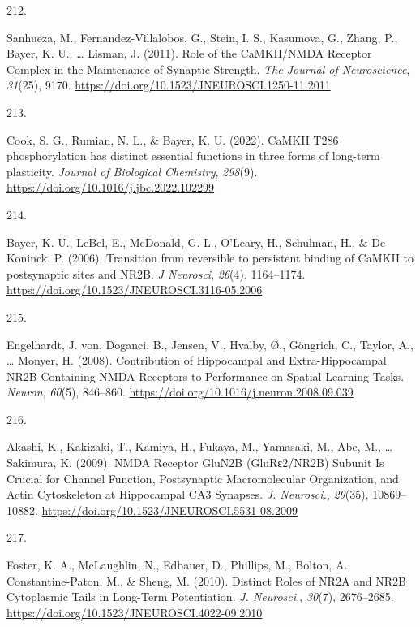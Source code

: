\documentclass[
  11pt,
  letterpaper,
]{scrreprt}
\newlength{\cslhangindent}
\newlength{\csllabelwidth}
\newenvironment{CSLReferences}[2] %
 {\begin{list}{}{%
  \setlength{\itemindent}{0pt}
  \setlength{\leftmargin}{0pt}
  \setlength{\parsep}{0pt}
  \ifodd #1
   \setlength{\leftmargin}{\cslhangindent}
   \setlength{\itemindent}{-1\cslhangindent}
  \fi
  \setlength{\itemsep}{#2\baselineskip}}}
 {\end{list}}
\newcommand{\CSLLeftMargin}[1]{\parbox[t]{\csllabelwidth}{\strut#1\strut}}
\newcommand{\CSLRightInline}[1]{\parbox[t]{\linewidth - \csllabelwidth}{\strut#1\strut}}
\begin{document}
\begin{CSLReferences}{0}{0}
\CSLLeftMargin{212. }%
\CSLRightInline{Sanhueza, M., Fernandez-Villalobos, G., Stein, I. S.,
Kasumova, G., Zhang, P., Bayer, K. U., \ldots{} Lisman, J. (2011). Role
of the {CaMKII}/{NMDA Receptor Complex} in the {Maintenance} of
{Synaptic Strength}. \emph{The Journal of Neuroscience}, \emph{31}(25),
9170. \url{https://doi.org/10.1523/JNEUROSCI.1250-11.2011}}

\CSLLeftMargin{213. }%
\CSLRightInline{Cook, S. G., Rumian, N. L., \& Bayer, K. U. (2022).
{CaMKII T286} phosphorylation has distinct essential functions in three
forms of long-term plasticity. \emph{Journal of Biological Chemistry},
\emph{298}(9). \url{https://doi.org/10.1016/j.jbc.2022.102299}}

\CSLLeftMargin{214. }%
\CSLRightInline{Bayer, K. U., LeBel, E., McDonald, G. L., O'Leary, H.,
Schulman, H., \& De Koninck, P. (2006). Transition from reversible to
persistent binding of {CaMKII} to postsynaptic sites and {NR2B}. \emph{J
Neurosci}, \emph{26}(4), 1164--1174.
\url{https://doi.org/10.1523/JNEUROSCI.3116-05.2006}}

\CSLLeftMargin{215. }%
\CSLRightInline{Engelhardt, J. von, Doganci, B., Jensen, V., Hvalby, Ø.,
Göngrich, C., Taylor, A., \ldots{} Monyer, H. (2008). Contribution of
{Hippocampal} and {Extra-Hippocampal NR2B-Containing NMDA Receptors} to
{Performance} on {Spatial Learning Tasks}. \emph{Neuron}, \emph{60}(5),
846--860. \url{https://doi.org/10.1016/j.neuron.2008.09.039}}

\CSLLeftMargin{216. }%
\CSLRightInline{Akashi, K., Kakizaki, T., Kamiya, H., Fukaya, M.,
Yamasaki, M., Abe, M., \ldots{} Sakimura, K. (2009). {NMDA Receptor
GluN2B} ({GluRε2}/{NR2B}) {Subunit Is Crucial} for {Channel Function},
{Postsynaptic Macromolecular Organization}, and {Actin Cytoskeleton} at
{Hippocampal CA3 Synapses}. \emph{J. Neurosci.}, \emph{29}(35),
10869--10882. \url{https://doi.org/10.1523/JNEUROSCI.5531-08.2009}}

\CSLLeftMargin{217. }%
\CSLRightInline{Foster, K. A., McLaughlin, N., Edbauer, D., Phillips,
M., Bolton, A., Constantine-Paton, M., \& Sheng, M. (2010). Distinct
{Roles} of {NR2A} and {NR2B Cytoplasmic Tails} in {Long-Term
Potentiation}. \emph{J. Neurosci.}, \emph{30}(7), 2676--2685.
\url{https://doi.org/10.1523/JNEUROSCI.4022-09.2010}}


\end{CSLReferences}
\end{document}

